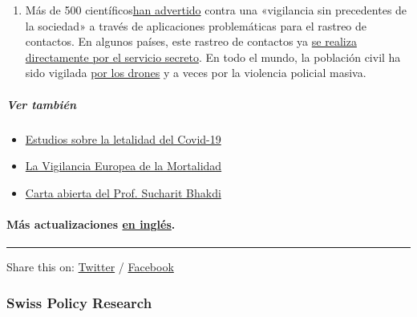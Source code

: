 \begin{enumerate}
{  de una «epidemia mediática»}.
\item
  Más de 500
  científicos\href{https://www.esat.kuleuven.be/cosic/sites/contact-tracing-joint-statement/}{han
  advertido} contra una «vigilancia sin precedentes de la sociedad» a
  través de aplicaciones problemáticas para el rastreo de contactos. En
  algunos países, este rastreo de contactos ya
  \href{https://www.jewishpress.com/news/the-courts/state-to-high-court-even-more-shin-bet-involvement-in-fighting-the-coronavirus/2020/04/14/}{se
  realiza directamente por el servicio secreto}. En todo el mundo, la
  población civil ha sido vigilada
  \href{https://off-guardian.org/2020/04/25/50-headlines-darker-more-of-the-new-normal/}{por
  los drones} y a veces por la violencia policial masiva.
\end{enumerate}

\hypertarget{ver-tambiuxe9n}{%
\subparagraph{\texorpdfstring{\textbf{Ver
también}}{Ver también}}\label{ver-tambiuxe9n}}

\begin{itemize}
\tightlist
\item
  \href{https://swprs.org/studies-on-covid-19-lethality/}{Estudios sobre
  la letalidad del Covid-19}
\item
  \href{http://euromomo.eu}{La Vigilancia Europea de la Mortalidad}
\item
  \href{http://piensachile.com/2020/03/carta-abierta-a-angela-merkel/}{Carta
  abierta del Prof. Sucharit Bhakdi}
\end{itemize}

\hypertarget{muxe1s-actualizaciones-en-ingluxe9s}{%
\paragraph{\texorpdfstring{Más actualizaciones
\href{https://swprs.org/a-swiss-doctor-on-covid-19/}{en
inglés}.}{Más actualizaciones en inglés.}}\label{muxe1s-actualizaciones-en-ingluxe9s}}

\begin{center}\rule{0.5\linewidth}{\linethickness}\end{center}

Share this on:
\href{https://twitter.com/intent/tweet?url=https://swprs.org/hechos-sobre-covid-19/}{Twitter}
/
\href{https://www.facebook.com/share.php?u=https://swprs.org/hechos-sobre-covid-19/}{Facebook}

\hypertarget{swiss-policy-research}{%
\subsubsection{Swiss Policy Research}\label{swiss-policy-research}}

